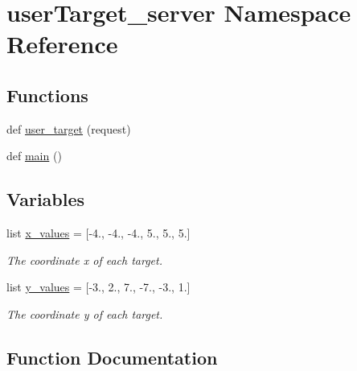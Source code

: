 \hypertarget{namespaceuser_target__server}{}\section{user\+Target\+\_\+server Namespace Reference}
\label{namespaceuser_target__server}
\subsection*{Functions}
\begin{DoxyCompactItemize}
\item 
def \hyperlink{namespaceuser_target__server_a79d179c6be990820ef65f28b6183bbcf}{user\+\_\+target} (request)
\item 
def \hyperlink{namespaceuser_target__server_ac4436b0eb034db7c5de7e66414e53b9f}{main} ()
\end{DoxyCompactItemize}
\subsection*{Variables}
\begin{DoxyCompactItemize}
\item 
list \hyperlink{namespaceuser_target__server_a9786e0cedd2e00e30c53625b8bbc6875}{x\+\_\+values} = \mbox{[}-\/4., -\/4., -\/4., 5., 5., 5.\mbox{]}
\begin{DoxyCompactList}\small\item\em The coordinate x of each target. \end{DoxyCompactList}\item 
list \hyperlink{namespaceuser_target__server_add80632cb35d626e8af7d47d64f9db2b}{y\+\_\+values} = \mbox{[}-\/3., 2., 7., -\/7., -\/3., 1.\mbox{]}
\begin{DoxyCompactList}\small\item\em The coordinate y of each target. \end{DoxyCompactList}\end{DoxyCompactItemize}


\subsection{Function Documentation}
